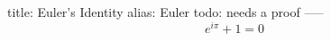 title: Euler's Identity
alias: Euler
todo: needs a proof
-----
\begin{equation}
e^{i\pi} + 1 = 0 \label{eq:euler}
\end{equation}
